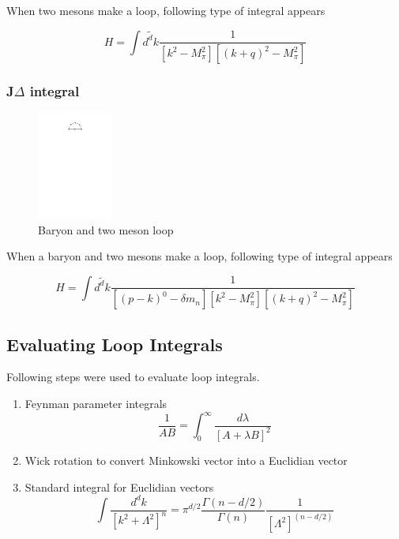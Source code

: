 \documentclass{article}
\newcommand{\beq}{\begin{equation}}
\newcommand{\eeq}{\end{equation}}
\begin{document}
When two mesons make a loop, following type of integral appears

\beq
H = \int \tilde{d^dk} \frac{   {1}    }{ \left[k^2-M_\pi^2 \right] \left[(k+q)^2-M_\pi^2 \right] } 
\eeq   


\subsubsection{J$\Delta$ integral}

\begin{figure}[h]
	\caption{Baryon and two meson loop}
	\includegraphics[trim={8cm 23.5cm 8cm 2cm}, clip=true,width=  2.5cm]{images/types of loops/2meson_baryon.pdf}
	\centering
\end{figure}

When a baryon and two mesons make a loop, following type of integral appears

\beq
H = \int \tilde{d^dk} \frac{   {1}    }{ \left[ \left(p-k\right)^0 -\delta m_n \right] \left[k^2-M_\pi^2 \right] \left[(k+q)^2-M_\pi^2 \right] } 
\eeq   



\subsection{Evaluating Loop Integrals}

\vspace{1mm}
Following steps were used to evaluate loop integrals.

\begin{enumerate}
	\item Feynman parameter integrals
	\beq
	\frac{1}{AB} =  \int_{0}^{\infty}   \frac{d\lambda}{ \left[ A+\lambda B \right] ^2 } \nonumber
	\eeq
	\item Wick rotation to convert Minkowski vector into a Euclidian vector
	\item Standard integral for Euclidian vectors \cite{Ramond}
	\beq
	\int \frac{d^dk}{ \left[ k^2+\Lambda^2 \right] ^n } =  \pi^{d/2}  \frac{ \Gamma \left( n-d/2 \right) }{\Gamma \left( n \right)} \frac{1}{ \left[ \Lambda^2 \right] ^{(n-d/2)} } \nonumber
	\eeq
\end{enumerate}
\end{document}
